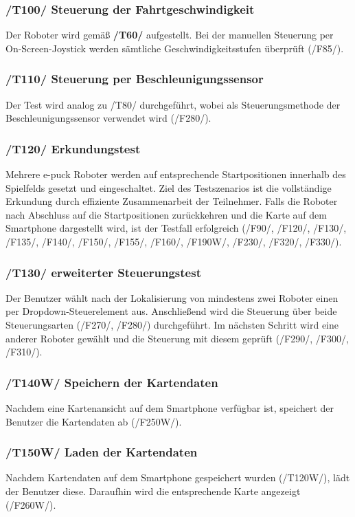\documentclass[10pt,a4paper]{article}
\begin{document}
			\subsubsection{/T100/ Steuerung der Fahrtgeschwindigkeit}
			Der Roboter wird gemäß \textbf{/T60/} aufgestellt. Bei der manuellen Steuerung per On-Screen-Joystick werden
			sämtliche Geschwindigkeitsstufen überprüft (/F85/).
			
			\subsubsection{/T110/ Steuerung per Beschleunigungssensor}
			Der Test wird analog zu /T80/ durchgeführt, wobei als Steuerungsmethode der Beschleunigungssensor
			verwendet wird (/F280/).
			
			\subsubsection{/T120/ Erkundungstest}
			Mehrere e-puck Roboter werden auf entsprechende Startpositionen innerhalb des Spielfelds gesetzt und
			eingeschaltet. Ziel des Testszenarios ist die vollständige Erkundung durch effiziente Zusammenarbeit der Teilnehmer.
			Falls die Roboter nach Abschluss auf die Startpositionen zurückkehren und die Karte auf dem Smartphone dargestellt
			wird, ist der Testfall erfolgreich (/F90/, /F120/, /F130/, /F135/, /F140/,
			/F150/, /F155/, /F160/, /F190W/, /F230/, /F320/, /F330/).
			
			\subsubsection{/T130/ erweiterter Steuerungstest}
			Der Benutzer wählt nach der Lokalisierung von mindestens zwei Roboter einen per Dropdown-Steuerelement aus.
			Anschließend wird die Steuerung über beide Steuerungsarten (/F270/, /F280/) durchgeführt. Im nächsten
			Schritt wird eine anderer Roboter gewählt und die Steuerung mit diesem geprüft (/F290/, /F300/, /F310/).
			
			\subsubsection{/T140W/ Speichern der Kartendaten}
			Nachdem eine Kartenansicht auf dem Smartphone verfügbar ist, speichert der Benutzer die Kartendaten ab (/F250W/).
			
			\subsubsection{/T150W/ Laden der Kartendaten}
			Nachdem Kartendaten auf dem Smartphone gespeichert wurden (/T120W/), lädt der Benutzer diese.
			Daraufhin wird die entsprechende Karte angezeigt (/F260W/).
			
\end{document}
